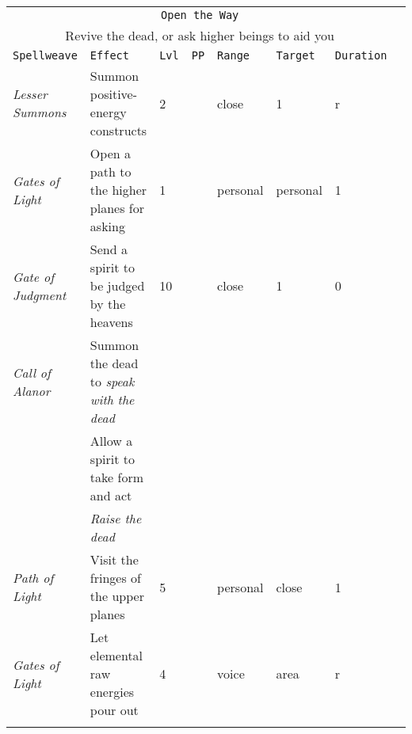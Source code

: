 \documentclass[10pt,a4paper]{article}
\begin{document}
\begin{table}[htbp!]
\begin{tabular}{llllllll}
    	
  \multicolumn{7}{c}{\texttt{Open the Way}}\\
  \multicolumn{7}{c}{Revive the dead, or ask higher beings to aid you}\\
    \hline
    \texttt{Spellweave} & \texttt{Effect} & \texttt{Lvl} & \texttt{PP} & \texttt{Range} & \texttt{Target} & \texttt{Duration} \\
    \hline
    \multirow{1}{*}{\textit{Lesser Summons}} & Summon positive-energy constructs & 2 && close  & 1 & r\\
    \hline
    \multirow{1}{*}{\textit{Gates of Light}} & Open a path to the higher planes for asking & 1 && personal & personal & 1\\
    \hline
    \multirow{1}{*}{\textit{Gate of Judgment}} & Send a spirit to be judged by the heavens & 10 && close & 1 & 0\\
    \hline
    \multirow{1}{*}{\textit{Call of Alanor}} & Summon the dead to \textit{speak with the dead} & &&  &  & \\
    											& Allow a spirit to take form and act &  &&  &  & \\
    											& \textit{Raise the dead} & && & & \\
    \hline
    \multirow{1}{*}{\textit{Path of Light}} & Visit the fringes of the upper planes & 5 && personal & close & 1\\
    \hline
    \multirow{1}{*}{\textit{Gates of Light}} & Let elemental raw energies pour out & 4 && voice & area & r\\
    &&&&&&\\ 
    
\end{tabular}
\end{table} 
\end{document}
